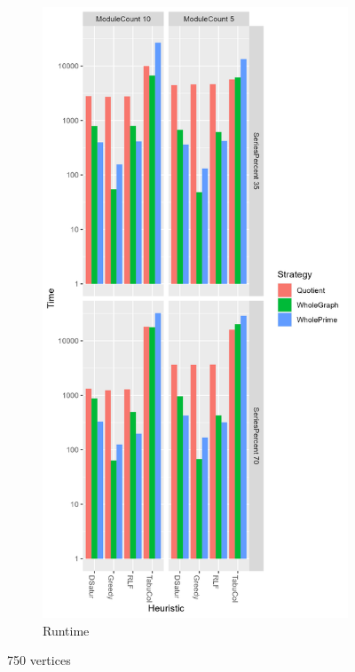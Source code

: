 \documentclass[a4paper]{article}
\begin{document}
\begin{figure}[p]
\begin{subfigure}{.4\paperwidth}
    \end{subfigure}%
    \begin{subfigure}{.4\paperwidth}
        \includegraphics[width=\columnwidth]{Tables/750Time.png}
      \caption{Runtime}
      \label{fig:750t}
    \end{subfigure}
\caption{750 vertices}
\label{fig:750}
\end{figure}
\end{document}
